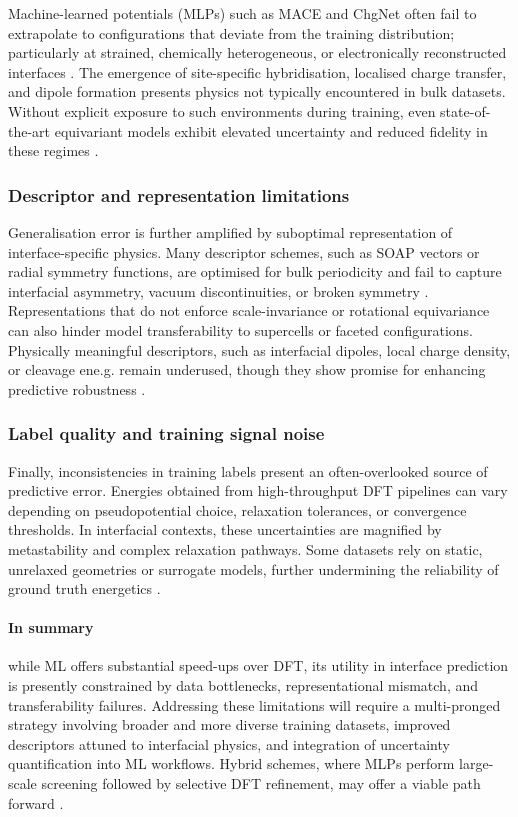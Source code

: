 Machine-learned potentials (MLPs) such as MACE  and ChgNet often fail to extrapolate to configurations that deviate from the training distribution; particularly at strained, chemically heterogeneous, or electronically reconstructed interfaces . The emergence of site-specific hybridisation, localised charge transfer, and dipole formation presents physics not typically encountered in bulk datasets. Without explicit exposure to such environments during training, even state-of-the-art equivariant models exhibit elevated uncertainty and reduced fidelity in these regimes .

\subsubsection{Descriptor and representation limitations}

Generalisation error is further amplified by suboptimal representation of interface-specific physics. Many descriptor schemes, such as SOAP vectors or radial symmetry functions, are optimised for bulk periodicity and fail to capture interfacial asymmetry, vacuum discontinuities, or broken symmetry . Representations that do not enforce scale-invariance or rotational equivariance can also hinder model transferability to supercells or faceted configurations. Physically meaningful descriptors, such as interfacial dipoles, local charge density, or cleavage ene.g. remain underused, though they show promise for enhancing predictive robustness .

\subsubsection{Label quality and training signal noise}

Finally, inconsistencies in training labels present an often-overlooked source of predictive error. Energies obtained from high-throughput DFT pipelines can vary depending on pseudopotential choice, relaxation tolerances, or convergence thresholds. In interfacial contexts, these uncertainties are magnified by metastability and complex relaxation pathways. Some datasets rely on static, unrelaxed geometries or surrogate models, further undermining the reliability of ground truth energetics .

\paragraph{In summary} while ML offers substantial speed-ups over DFT, its utility in interface prediction is presently constrained by data bottlenecks, representational mismatch, and transferability failures. Addressing these limitations will require a multi-pronged strategy involving broader and more diverse training datasets, improved descriptors attuned to interfacial physics, and integration of uncertainty quantification into ML workflows. Hybrid schemes, where MLPs perform large-scale screening followed by selective DFT refinement, may offer a viable path forward .